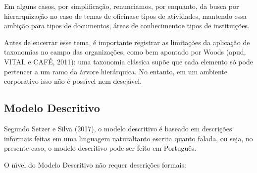 \documentclass[
12pt,		%
openright,	%
twoside,  %
a4paper,			%
chapter=TITLE,		%
english,			%
french,				%
spanish,			%
brazil				%
]{USPSC-classe/USPSC}
\begin{document}
Em alguns casos, por simplifica\c{c}\~ao, renunciamos, por enquanto, da busca por hierarquiza\c{c}\~ao no caso de \textquotedbl temas de oficinas\textquotedbl  e \textquotedbl tipos de atividades\textquotedbl , mantendo essa ambi\c{c}\~ao para \textquotedbl tipos de documentos\textquotedbl , \textquotedbl \'areas de conhecimento\textquotedbl  e \textquotedbl tipos de institui\c{c}\~oes\textquotedbl .










Antes de encerrar esse tema, \'e importante registrar as limita\c{c}\~oes da aplica\c{c}\~ao de taxonomias no campo das organiza\c{c}\~oes, como bem apontado por Woods  (apud, VITAL e CAF\'E, 2011): \textquotedbl uma taxonomia cl\'assica sup\~oe que cada elemento s\'o pode pertencer a um ramo da \'arvore hier\'arquica. No entanto, em um ambiente corporativo isso n\~ao \'e poss\'{\i}vel nem desej\'avel\textquotedbl .










\subsection[Modelo Descritivo]{Modelo Descritivo}\label{Modelo Descritivo}
Segundo Setzer e Silva (2017), o modelo descritivo \'e baseado em \textquotedbl descri\c{c}\~oes informais feitas em uma linguagem natural\textquotedbl  tanto escrita quanto falada, ou seja, no presente caso, o modelo descritivo pode ser feito em Portugu\^es.










O n\'{\i}vel do Modelo Descritivo n\~ao requer descri\c{c}\~oes formais:











\noindent\begin{center}\mbox{\centering{}}\end{center}
\end{document}
